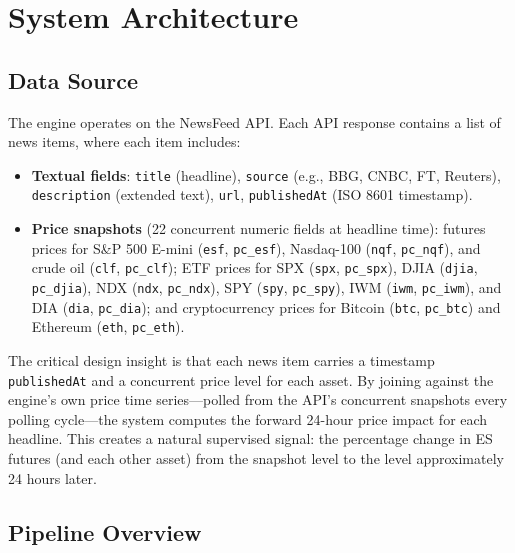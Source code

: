 \section{System Architecture}
\label{sec:architecture}

\subsection{Data Source}

The engine operates on the NewsFeed API. Each API response contains a list of news items, where each item includes:

\begin{itemize}
    \item \textbf{Textual fields}: \texttt{title} (headline), \texttt{source} (e.g., BBG, CNBC, FT, Reuters), \texttt{description} (extended text), \texttt{url}, \texttt{publishedAt} (ISO 8601 timestamp).
    \item \textbf{Price snapshots} (22 concurrent numeric fields at headline time): futures prices for S\&P 500 E-mini (\texttt{esf}, \texttt{pc\_esf}), Nasdaq-100 (\texttt{nqf}, \texttt{pc\_nqf}), and crude oil (\texttt{clf}, \texttt{pc\_clf}); ETF prices for SPX (\texttt{spx}, \texttt{pc\_spx}), DJIA (\texttt{djia}, \texttt{pc\_djia}), NDX (\texttt{ndx}, \texttt{pc\_ndx}), SPY (\texttt{spy}, \texttt{pc\_spy}), IWM (\texttt{iwm}, \texttt{pc\_iwm}), and DIA (\texttt{dia}, \texttt{pc\_dia}); and cryptocurrency prices for Bitcoin (\texttt{btc}, \texttt{pc\_btc}) and Ethereum (\texttt{eth}, \texttt{pc\_eth}).
\end{itemize}

The critical design insight is that each news item carries a timestamp \texttt{publishedAt} and a concurrent price level for each asset. By joining against the engine's own price time series---polled from the API's concurrent snapshots every polling cycle---the system computes the forward 24-hour price impact for each headline. This creates a natural supervised signal: the percentage change in ES futures (and each other asset) from the snapshot level to the level approximately 24 hours later.

\subsection{Pipeline Overview}

